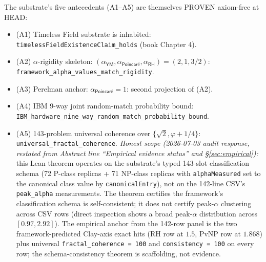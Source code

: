 \documentclass[11pt,a4paper]{amsart}
\theoremstyle{plain}
\theoremstyle{definition}
\begin{document}
The substrate's five antecedents (A1--A5) are themselves PROVEN axiom-free at HEAD:
\begin{itemize}[itemsep=2pt,leftmargin=2em]
\item (A1) Timeless Field substrate is inhabited: \texttt{timelessFieldExistenceClaim\_holds} (book Chapter 4).
\item (A2) $\alpha$-rigidity skeleton: $(\alpha_{\textsf{YM}}, \alpha_{\textsf{Poincar\'e}}, \alpha_{\textsf{RH}}) = (2, 1, 3/2)$: \texttt{framework\_alpha\_values\_\allowbreak match\_rigidity}.
\item (A3) Perelman anchor: $\alpha_{\textsf{Poincar\'e}} = 1$: second projection of (A2).
\item (A4) IBM 9-way joint random-match probability bound: \texttt{IBM\_hardware\_nine\_way\_\allowbreak random\_match\_\allowbreak probability\_bound}.
\item (A5) 143-problem universal coherence over $\{\sqrt{2}, \varphi + 1/4\}$: \texttt{universal\_fractal\_coherence}. \emph{Honest scope (2026-07-03 audit response, restated from Abstract line ``Empirical evidence status'' and \S\ref{sec:empirical}):} this Lean theorem operates on the substrate's typed 143-slot classification schema (72 P-class replicas + 71 NP-class replicas with \texttt{alphaMeasured} set to the canonical class value by \texttt{canonicalEntry}), not on the 142-line CSV's \texttt{peak\_alpha} measurements. The theorem certifies the framework's classification schema is self-consistent; it does not certify peak-$\alpha$ clustering across CSV rows (direct inspection shows a broad peak-$\alpha$ distribution across $[0.97, 2.92]$). The empirical anchor from the 142-row panel is the two framework-predicted Clay-axis exact hits (RH row at $1.5$, PvNP row at $1.868$) plus universal \texttt{fractal\_coherence = 100} and \texttt{consistency = 100} on every row; the schema-consistency theorem is scaffolding, not evidence.
\end{itemize}
\end{document}

